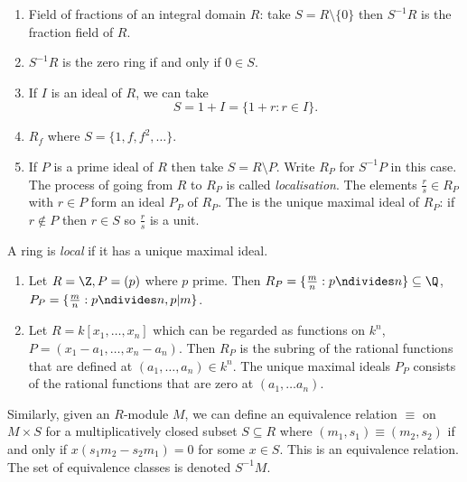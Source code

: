\documentclass[a4paper]{article}
\begin{document}
\begin{eg}\leavevmode
  \begin{enumerate}
  \item Field of fractions of an integral domain \(R\): take \(S = R \setminus \{0\}\) then \(S^{-1}R\) is the fraction field of \(R\).
  \item \(S^{-1}R\) is the zero ring if and only if \(0 \in S\).
  \item If \(I\) is an ideal of \(R\), we can take
    \[
      S = 1 + I = \{1 + r: r \in I\}.
    \]
  \item \(R_f\) where \(S = \{1, f, f^2, \dots\}\).
  \item If \(P\) is a prime ideal of \(R\) then take \(S = R \setminus P\). Write \(R_P\) for \(S^{-1}P\) in this case. The process of going from \(R\) to \(R_P\) is called \emph{localisation}. The elements \(\frac{r}{s} \in R_P\) with \(r \in P\) form an ideal \(P_P\) of \(R_P\). The is the unique maximal ideal of \(R_P\): if \(r \notin P\) then \(r \in S\) so \(\frac{r}{s}\) is a unit.
  \end{enumerate}
\end{eg}

\begin{definition}
  A ring is \emph{local} if it has a unique maximal ideal.
\end{definition}

\begin{eg}\leavevmode
  \begin{enumerate}
  \item Let \(R = \Z, P = (p)\) where \(p\) prime. Then \(R_P = \{\frac{m}{n}: p \ndivides n\} \subseteq \Q\), \(P_P = \{\frac{m}{n}: p \ndivides n, p |m\}\).
  \item Let \(R = k[x_1, \dots, x_n]\) which can be regarded as functions on \(k^n\), \(P = (x_1 - a_1, \dots, x_n - a_n)\). Then \(R_P\) is the subring of the rational functions that are defined at \((a_1, \dots, a_n) \in k^n\). The unique maximal ideals \(P_P\) consists of the rational functions that are zero at \((a_1, \dots a_n)\).
  \end{enumerate}
\end{eg}

Similarly, given an \(R\)-module \(M\), we can define an equivalence relation \(\equiv\) on \(M \times S\) for a multiplicatively closed subset \(S \subseteq R\) where \((m_1, s_1) \equiv (m_2, s_2)\) if and only if \(x(s_1m_2 - s_2m_1) = 0\) for some \(x \in S\). This is an equivalence relation. The set of equivalence classes is denoted \(S^{-1}M\).
\end{document}
